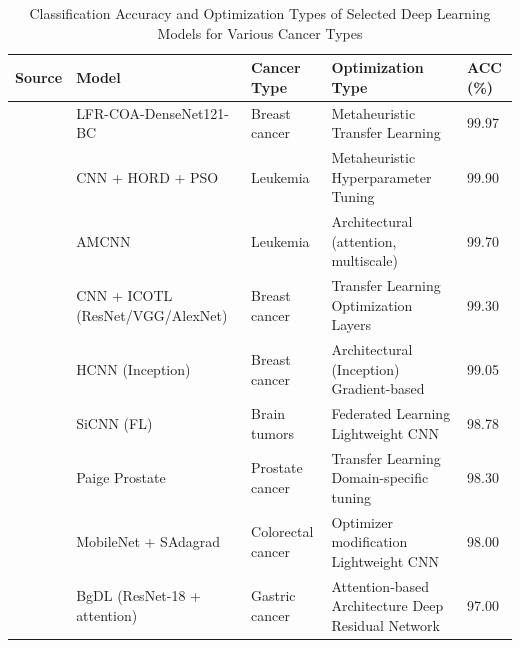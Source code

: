 \renewcommand{\arraystretch}{1.25}
\begin{table}[t]
\centering
\caption{Classification Accuracy and Optimization Types of Selected Deep Learning Models for Various Cancer Types}
\label{tab:model-accuracy}
\begin{tabular}{|p{1.2cm}|p{4.3cm}|p{3.3cm}|p{4cm}|p{1.1cm}|}
\hline
\textbf{Source} & \textbf{Model} & \textbf{Cancer Type} & \textbf{Optimization Type} & \textbf{ACC (\%)} \\
\hline
\cite{GG1} & LFR-COA-DenseNet121-BC & Breast cancer & Metaheuristic \newline Transfer Learning & 99.97 \\
\cite{II1} & CNN + HORD + PSO & Leukemia & Metaheuristic \newline Hyperparameter Tuning & 99.90 \\
\cite{AA1} & AMCNN & Leukemia & Architectural (attention, multiscale) & 99.70 \\
\cite{GG1} & CNN + ICOTL (ResNet/VGG/AlexNet) & Breast cancer & Transfer Learning \newline Optimization Layers & 99.30 \\
\cite{JJ2} & HCNN (Inception) & Breast cancer & Architectural (Inception) \newline Gradient-based & 99.05 \\
\cite{JJ1} & SiCNN (FL) & Brain tumors & Federated Learning \newline Lightweight CNN & 98.78 \\
\cite{HH2} & Paige Prostate & Prostate cancer & Transfer Learning \newline Domain-specific tuning & 98.30 \\
\cite{DD2} & MobileNet + SAdagrad & Colorectal cancer & Optimizer modification \newline Lightweight CNN & 98.00 \\
\cite{II2} & BgDL (ResNet-18 + attention) & Gastric cancer & Attention-based Architecture \newline Deep Residual Network & 97.00 \\
\hline
\end{tabular}
\end{table}


